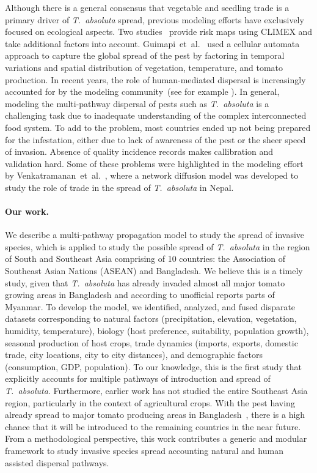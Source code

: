 \documentclass[11pt]{article}
\newcommand{\tuta}{\emph{T.~absoluta}}
\theoremstyle{definition}
\begin{document}
Although there is a general consensus that vegetable and seedling trade is a
primary driver of \tuta{} spread, previous modeling efforts have
exclusively focused on ecological aspects. Two
studies~\cite{desneux2010biological,tonnang2015identification} provide risk
maps using CLIMEX and take additional factors into account.
Guimapi~et~al.~\cite{guimapi2016modeling} used a
cellular automata approach to capture the global spread of the pest by
factoring in temporal variations and spatial distribution of vegetation,
temperature, and tomato production. In recent years, the role of
human-mediated dispersal is increasingly accounted for by the
modeling community~(see for example
\cite{robinet2009role,ercsey2012complexity,nopsa2015ecological,colunga2015following}).
In general, modeling the multi-pathway dispersal of pests such as \tuta{}
is a challenging task due to inadequate understanding of the complex
interconnected food system. To add to the
problem, most countries ended up not being prepared for the infestation,
either due to lack of awareness of the pest or the sheer speed of invasion.
Absence of quality incidence records makes callibration and validation
hard. Some of these problems were highlighted in the modeling
effort by Venkatramanan~et~al.~\cite{venkatramanan2017towards}, where a
network diffusion model was developed to study the role of trade in the
spread of \tuta{} in Nepal.

\paragraph{Our work.} We describe a multi-pathway propagation model to
study the spread of invasive species, which is applied to study the
possible spread of \tuta{} in the region of South and Southeast Asia comprising of 10
countries: the Association of Southeast Asian Nations (ASEAN) and Bangladesh.
We believe this is a timely study, given that \tuta{} has already invaded almost all major tomato growing
areas in Bangladesh and according to unofficial reports parts of Myanmar.
To develop the model, we identified, analyzed,
and fused disparate datasets corresponding to natural factors
(precipitation, elevation, vegetation, humidity, temperature), biology
(host preference, suitability, population growth), seasonal production of
host crops, trade dynamics (imports, exports, domestic trade, city
locations, city to city distances), and demographic factors (consumption,
GDP, population).
To our knowledge,  this is the first study that explicitly
accounts for multiple pathways of introduction and spread of \tuta{}.
Furthermore, earlier work has not studied the entire Southeast Asia region,
particularly in the context of agricultural crops.  With the pest having already spread
to major tomato producing areas in Bangladesh~\cite{hossain2016first},
there is a high chance that it will be introduced to the remaining
countries in the near future. From a methodological perspective, this
work contributes a generic and modular framework to study invasive
species spread accounting natural and human assisted dispersal
pathways. 
\end{document}
